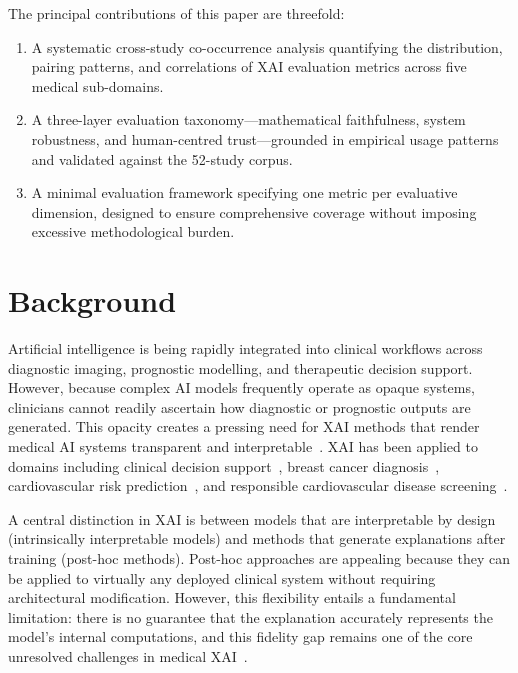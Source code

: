 The principal contributions of this paper are threefold:
\begin{enumerate}
    \item A systematic cross-study co-occurrence analysis quantifying the distribution, pairing patterns, and correlations of XAI evaluation metrics across five medical sub-domains.
    \item A three-layer evaluation taxonomy---mathematical faithfulness, system robustness, and human-centred trust---grounded in empirical usage patterns and validated against the 52-study corpus.
    \item A minimal evaluation framework specifying one metric per evaluative dimension, designed to ensure comprehensive coverage without imposing excessive methodological burden.
\end{enumerate}


\section{Background}

Artificial intelligence is being rapidly integrated into clinical workflows
across diagnostic imaging, prognostic modelling, and therapeutic decision
support. However, because complex AI models frequently operate as opaque
systems, clinicians cannot readily ascertain how diagnostic or prognostic
outputs are generated. This opacity creates a pressing need for XAI methods
that render medical AI systems transparent and
interpretable~\cite{Tjoa2021MedicalXAI}. XAI has been applied to domains
including clinical decision
support~\cite{abbas2025explainable}, breast cancer
diagnosis~\cite{saharan2025explainable}, cardiovascular risk
prediction~\cite{shah2025explainable}, and responsible cardiovascular disease
screening~\cite{muneer2025blockchain}.

A central distinction in XAI is between models that are interpretable by
design (intrinsically interpretable models) and methods that generate
explanations after training (post-hoc methods). Post-hoc approaches are
appealing because they can be applied to virtually any deployed clinical
system without requiring architectural modification. However, this
flexibility entails a fundamental limitation: there is no guarantee that the
explanation accurately represents the model's internal computations, and
this fidelity gap remains one of the core unresolved challenges in medical
XAI~\cite{holzinger2022information,palatnik2021xai}.

